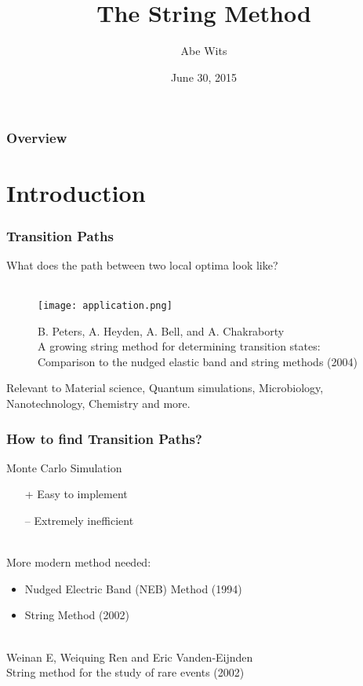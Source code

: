 \documentclass{beamer}
\title[String Method]{The String Method} %
\author{Abe Wits}
\institute[UU]
{
Utrecht University\\
\medskip
\textit{A.J.G.Wits@uu.nl}
}
\date{June 30, 2015}
\renewcommand{\(}{\left(}
\renewcommand{\)}{\right)}
\begin{document}
\begin{frame}
\titlepage
\end{frame}

\begin{frame}
\frametitle{Overview}
\tableofcontents
\end{frame}

\section{Introduction}

\begin{frame}
\frametitle{Transition Paths}
What does the path between two local optima look like?\\
~\\

\begin{figure}
\texttt{[image: application.png]}
\caption{B. Peters, A. Heyden, A. Bell, and A. Chakraborty\\ A growing string method for determining transition states:
Comparison to the nudged elastic band and string methods (2004)}
\end{figure}

Relevant to Material science, Quantum simulations, Microbiology, Nanotechnology, Chemistry and more.

\end{frame}

\begin{frame}
\frametitle{How to find Transition Paths?}
Monte Carlo Simulation\\
\begin{itemize}
\item[+] Easy to implement
\item[--] Extremely inefficient
\end{itemize}
~\\
More modern method needed:\\
\begin{itemize}
\item Nudged Electric Band (NEB) Method (1994)\\
\item String Method (2002)
\end{itemize}
~\\
Weinan E, Weiquing Ren and Eric Vanden-Eijnden\\
String method for the study of rare events (2002)
\end{frame}
\end{document}
